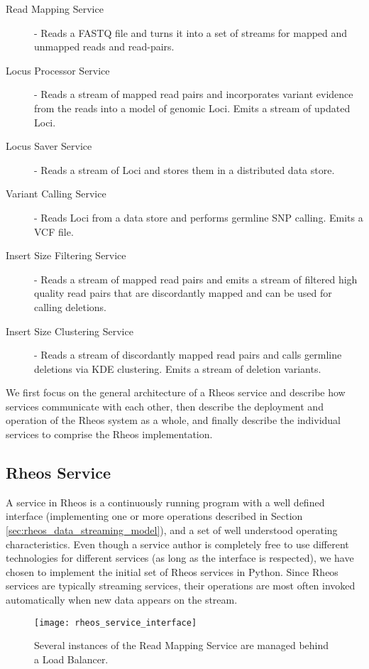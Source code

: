 \begin{description}
    \item [Read Mapping Service] - Reads a FASTQ file and turns it into a set of streams for mapped and unmapped reads and read-pairs.
    \item [Locus Processor Service] - Reads a stream of mapped read pairs and incorporates variant evidence from the reads into a model of genomic Loci. Emits a stream of updated Loci.
    \item [Locus Saver Service] - Reads a stream of Loci and stores them in a distributed data store.
    \item [Variant Calling Service] - Reads Loci from a data store and performs germline SNP calling. Emits a VCF file.
    \item [Insert Size Filtering Service] - Reads a stream of mapped read pairs and emits a stream of filtered high quality read pairs that are discordantly mapped and can be used for calling deletions.
    \item [Insert Size Clustering Service] - Reads a stream of discordantly mapped read pairs and calls germline deletions via KDE clustering. Emits a stream of deletion variants.
\end{description}

We first focus on the general architecture of a Rheos service and describe how services communicate with each other, then describe the deployment and operation of the Rheos system as a whole, and finally describe the individual services to comprise the Rheos implementation.

\subsection{Rheos Service}
A service in Rheos is a continuously running program with a well defined interface (implementing one or more operations described in Section \ref{sec:rheos_data_streaming_model}), and a set of well understood operating characteristics. Even though a service author is completely free to use different technologies for different services (as long as the interface is respected), we have chosen to implement the initial set of Rheos services in Python. Since Rheos services are typically streaming services, their operations are most often invoked automatically when new data appears on the stream.

\begin{figure}[H]
    \texttt{[image: rheos\_service\_interface]}
    \centering
    \caption {Several instances of the Read Mapping Service are managed behind a Load Balancer.}
    \label{fig:rheos_service_interface}
\end{figure}

